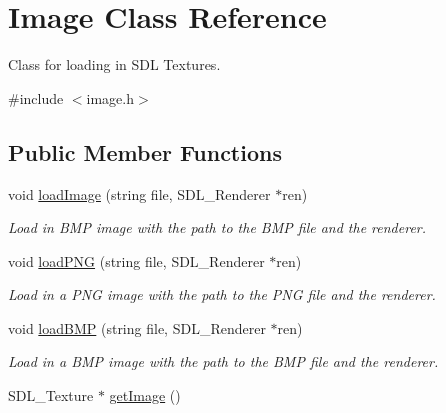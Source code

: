 \hypertarget{classImage}{}\section{Image Class Reference}
\label{classImage}


Class for loading in S\+DL Textures.  




{\ttfamily \#include $<$image.\+h$>$}

\subsection*{Public Member Functions}
\begin{DoxyCompactItemize}
\item 
void \hyperlink{classImage_a776ab55f3884f994512aa092cd7fa250}{load\+Image} (string file, S\+D\+L\+\_\+\+Renderer $\ast$ren)\hypertarget{classImage_a776ab55f3884f994512aa092cd7fa250}{}\label{classImage_a776ab55f3884f994512aa092cd7fa250}

\begin{DoxyCompactList}\small\item\em Load in B\+MP image with the path to the B\+MP file and the renderer. \end{DoxyCompactList}\item 
void \hyperlink{classImage_ab00c4a53e3154287075c956c805e1cb1}{load\+P\+NG} (string file, S\+D\+L\+\_\+\+Renderer $\ast$ren)\hypertarget{classImage_ab00c4a53e3154287075c956c805e1cb1}{}\label{classImage_ab00c4a53e3154287075c956c805e1cb1}

\begin{DoxyCompactList}\small\item\em Load in a P\+NG image with the path to the P\+NG file and the renderer. \end{DoxyCompactList}\item 
void \hyperlink{classImage_ad37ad8bd7d9572be7fbbd921a299d235}{load\+B\+MP} (string file, S\+D\+L\+\_\+\+Renderer $\ast$ren)\hypertarget{classImage_ad37ad8bd7d9572be7fbbd921a299d235}{}\label{classImage_ad37ad8bd7d9572be7fbbd921a299d235}

\begin{DoxyCompactList}\small\item\em Load in a B\+MP image with the path to the B\+MP file and the renderer. \end{DoxyCompactList}\item 
S\+D\+L\+\_\+\+Texture $\ast$ \hyperlink{classImage_a52ca04ec008e5275a14915574035e599}{get\+Image} ()\hypertarget{classImage_a52ca04ec008e5275a14915574035e599}{}\label{classImage_a52ca04ec008e5275a14915574035e599}


\end{DoxyCompactItemize}
